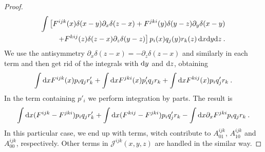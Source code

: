 \begin{proof}
    \begin{align*}
        \int \big[ F^{ijk}(x) \delta(x-y) \partial_x \delta(z-x) 
        + F^{jki}(y) \delta(y-z) \partial_y \delta(x-y) \\
        + F^{kij}(z) \delta(z-x) \partial_z \delta(y-z) \big] \,
        p_i(x) q_j(y) r_k(z) \,\mathrm{d} x \mathrm{d} y \mathrm{d} z \:.
    \end{align*}
    We use the antisymmetry $
        \partial_x \delta(z-x) = - \partial_z \delta (z-x)$
    and similarly in each term and then get rid of the integrals with $\mathrm{d} y$ and $\mathrm{d} z$, obtaining
    \begin{align*}
        \int \mathrm{d} x F^{ijk}(x) p_i q_j r'_k + \int \mathrm{d} x F^{jki}(x)  p'_i q_j r_k +
        \int \mathrm{d} x F^{kij}(x) p_i q'_j r_k \:.
    \end{align*}
    In the term containing $p'_i$ we perform integration by parts. The result is
    \begin{align*}
        \int \mathrm{d} x (F^{ijk}-F^{jki}) p_i q_j  r'_k +
        \int \mathrm{d} x (F^{kij}-F^{jki}) p_i q'_j r_k -
        \int \mathrm{d} x \partial_x F^{jki} p_i q_j r_k \:.
    \end{align*}
    In this particular case, we end up with terms, witch contribute to $A^{ijk}_{01}$, $A^{ijk}_{10}$ and $A^{ijk}_{00}$, respectively. Other terms in $\mathcal J^{ijk}(x,y,z)$ are handled in the similar way.


\end{proof}

